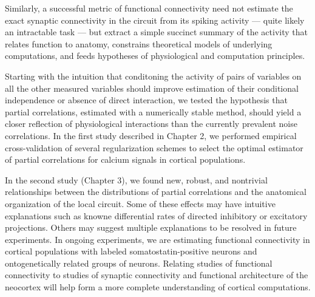 Similarly, a successful metric of functional connectivity need not estimate the exact synaptic connectivity in the circuit from its spiking activity --- quite likely an intractable task --- but extract a simple succinct summary of the activity that relates function to anatomy, constrains theoretical models of underlying computations, and feeds hypotheses of  physiological and computation principles.

 Starting with the intuition that conditoning the activity of pairs of variables on all the other measured variables should improve estimation of their conditional independence or absence of direct interaction, we tested the hypothesis that partial correlations, estimated with a numerically stable method, should yield a closer reflection of physiological interactions than the currently prevalent noise correlations. In the first study described in Chapter 2, we performed empirical cross-validation of several regularization schemes to select the optimal estimator of partial correlations for calcium signals in cortical populations. 

In the second study (Chapter 3), we found new, robust, and nontrivial relationships between the distributions of partial correlations and the anatomical organization of the local circuit. Some of these effects may have intuitive explanations such as knowne  differential  rates of directed inhibitory or excitatory projections.  Others may suggest multiple explanations to be resolved in future experiments. In ongoing experiments, we are estimating functional connectivity in cortical populations with labeled somatostatin-positive neurons and ontogenetically related groups of neurons. Relating studies of functional connectivity to studies of synaptic connectivity and functional architecture of the neocortex will help form a more complete understanding of cortical computations.
